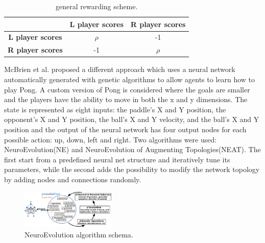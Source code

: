 \begin{table}[ht]
  \renewcommand{\arraystretch}{1.3}
  \caption{general rewarding scheme.}
  \label{tab:reward-scheme-2}
  \centering
  \begin{tabular}{c|c|c|}
    \cline{2-3}
                                                   & \textbf{L player scores} & \textbf{R player scores} \\ \hline
    \multicolumn{1}{|c|}{\textbf{L player scores}} & $\rho$                   & -1                       \\ \hline
    \multicolumn{1}{|c|}{\textbf{R player scores}} & -1                       & $\rho$                   \\ \hline
  \end{tabular}
\end{table}

McBrien et al. \cite{mcbrien2020learning} proposed a different approach which uses a neural network automatically generated with genetic algorithms to allow agents to learn how to play Pong.
%
A custom version of Pong is considered where the goals are smaller and the players have the ability to move in both the x and y dimensions.
%
The state is represented as eight inputs: the paddle's X and Y position, the opponent's X and Y position, the ball's X and Y velocity,
and the ball's X and Y position and the output of the neural network has four output nodes for each possible action: up, down, left and right.
%
Two algorithms were used: NeuroEvolution(NE) and NeuroEvolution of Augmenting Topologies(NEAT).
The first start from a predefined neural net structure and iteratively tune its parameters, while the second adds the possibility to modify the network topology by adding nodes and connections randomly.

\begin{figure}[ht]
  \centering
  \includegraphics[width=0.4\textwidth]{images/neuroevolution.png}
  \caption{NeuroEvolution algorithm schema.}
  \label{fig:ne}
\end{figure}
